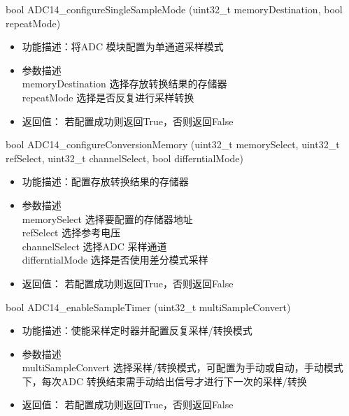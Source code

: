 \documentclass[a4paper,10pt,UTF8]{paper}
\numberwithin{equation}{section}
\numberwithin{figure}{section}
\begin{document}
\begin{ccode}
    bool ADC14_configureSingleSampleMode (uint32_t
    memoryDestination, bool repeatMode)            
    
\end{ccode}

\begin{itemize}
    \item 功能描述：将ADC 模块配置为单通道采样模式
          
    \item 参数描述 \\ memoryDestination     选择存放转换结果的存储器 \\ repeatMode                选择是否反复进行采样转换
    \item   返回值： 若配置成功则返回True，否则返回False
\end{itemize}

\begin{ccode}
    bool ADC14_configureConversionMemory 
    (uint32_t memorySelect, uint32_t refSelect,
    uint32_t channelSelect, bool differntialMode)         
\end{ccode}

\begin{itemize}
    \item 功能描述：配置存放转换结果的存储器
          
    \item 参数描述 \\ memorySelect    选择要配置的存储器地址 \\
          refSelect            选择参考电压 \\ 
          channelSelect     选择ADC 采样通道 \\ differntialMode   选择是否使用差分模式采样
    \item   返回值： 若配置成功则返回True，否则返回False
\end{itemize}

\begin{ccode}
    bool ADC14_enableSampleTimer (uint32_t multiSampleConvert)      
            
\end{ccode}

\begin{itemize}
    \item 功能描述：使能采样定时器并配置反复采样/转换模式  
          
    \item 参数描述 \\ multiSampleConvert     选择采样/转换模式，可配置为手动或自动，手动模式下，每次ADC 转换结束需手动给出信号才进行下一次的采样/转换  
          
    \item   返回值： 若配置成功则返回True，否则返回False
\end{itemize}
\end{document}
